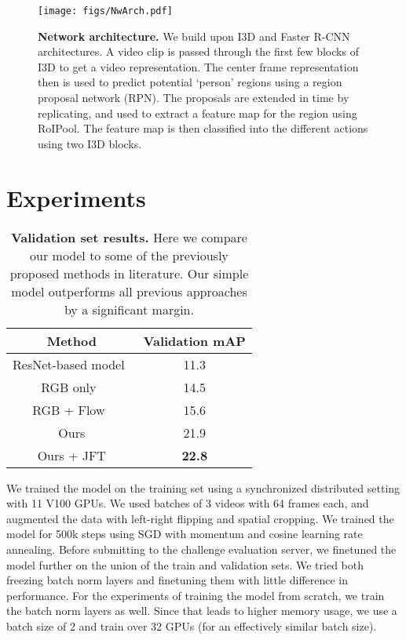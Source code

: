 \documentclass{article}
\newcommand{\valap}{22.8}
\begin{document}
\begin{figure}[t]
    \centering
    \texttt{[image: figs/NwArch.pdf]}
    \caption{{\bf Network architecture.} We build upon I3D and Faster R-CNN architectures. A video clip is passed through the first few blocks of I3D to get a video representation. The center frame representation then is used to predict potential `person' regions using a region proposal network (RPN). The proposals are extended in time by replicating, and used to extract a feature map for the region using RoIPool. The feature map is then classified into the different actions using two I3D blocks.}
    \label{fig:nwarch}
\end{figure}

\section{Experiments}



\begin{table}
{\caption{{\bf Validation set results.} Here we compare our model to some of the previously proposed methods in literature. Our simple model outperforms all previous approaches by a significant margin.}\label{the_table}}{\begin{center}
\begin{tabular}{cc}
\toprule
Method & Validation mAP \\
\midrule
ResNet-based model~\cite{ava_baseline} & 11.3 \\
RGB only~\cite{gu2017ava} & 14.5 \\
RGB + Flow~\cite{gu2017ava} & 15.6 \\
Ours & 21.9 \\
Ours + JFT & {\bf \valap{}} \\
\bottomrule
\end{tabular}
\end{center}}
\end{table}



We trained the model on the training set using a synchronized distributed setting with 11 V100 GPUs. 
  We used batches of 3 videos with 64 frames each, and augmented the data with left-right flipping and spatial cropping. 
  We trained the model for 500k steps using SGD with momentum and cosine learning rate annealing. 
  Before submitting to the challenge evaluation server, we finetuned the model further on the union of the train and validation sets. 
  We tried both freezing batch norm layers and finetuning them with little difference in performance.
  For the experiments of training the model from scratch, we train the batch norm layers as well. Since that leads to higher memory usage, we use a batch size of 2 and train over 32 GPUs (for an effectively similar batch size).
\end{document}
